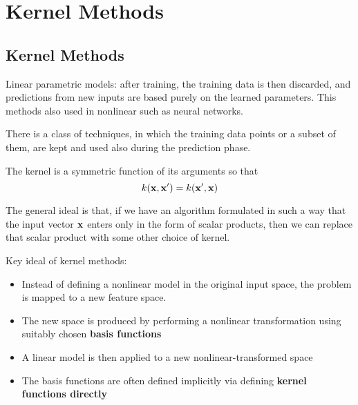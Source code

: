 \chapter{Kernel Methods}
\section{Kernel Methods}
Linear parametric models: after training, the training data is then
discarded, and predictions from new inputs are based purely on the learned
parameters. This methods also used in nonlinear such as neural networks.

There is a class of techniques, in which the training data points or a
subset of them, are kept and used also during the prediction phase.

The kernel is a symmetric function of its arguments so that 
\[ k(\mathbf{x}, \mathbf{x}') = k(\mathbf{x}', \mathbf{x})\]

The general ideal is that, if we have an algorithm formulated in such a
way that the input vector $\mathbf{x}$ enters only in the form of scalar
products, then we can replace that scalar product with some other choice
of kernel. 

Key ideal of kernel methods:
\begin{itemize}
    \item Instead of defining a nonlinear model in the original input
        space, the problem is mapped to a new feature space. 
    \item The new space is produced by performing a nonlinear
        transformation using suitably chosen \textbf{basis functions}
    \item A linear model is then applied to a new nonlinear-transformed
        space
    \item The basis functions are often defined implicitly via defining
        \textbf{kernel functions directly}
\end{itemize}
